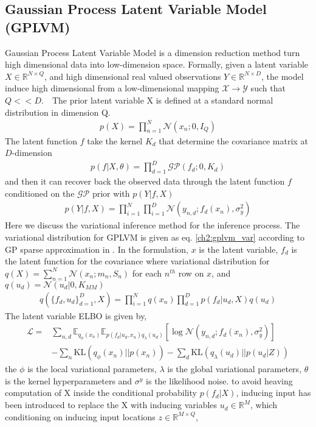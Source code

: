 \subsection{Gaussian Process Latent Variable Model (GPLVM)}
Gaussian Process Latent Variable Model \cite{lawrence_gaussian_nodate,titsias_bayesian_nodate} is a dimension reduction method turn high dimensional data into low-dimension space. Formally, given a latent variable $ X\in\mathbb{R}^{N\times Q} $, and high dimensional real valued observations $ Y\in\mathbb{R}^{N\times D} $, the model induce high dimensional from a low-dimensional mapping $ \mathcal{X}\rightarrow\mathcal{Y} $ such that $ Q<<D $.　The prior latent variable X is defined at a standard normal distribution in dimension Q.
\begin{align*}
p(X)=\prod_{n=1}^{N}\mathcal{N}(x_n;0,I_Q)
\end{align*}
The latent function $ f $ take the kernel $ K_d $ that determine the covariance matrix at $ D $-dimension
\begin{align*}
p(f|X,\theta)=\prod_{d=1}^{D}\mathcal{GP}(f_d;0,K_d)
\end{align*}
and then it can recover back the observed data through the latent function $ f $ conditioned on the $ \mathcal{GP} $ prior with $ p(Y|f,X) $
\begin{align*}
p(Y|f,X)=\prod_{i=1}^{N}\prod_{i=1}^{D}\mathcal{N}(y_{n,d};f_d(x_n),\sigma_y^2)
\end{align*}
Here we discuss the variational inference method for the inference process. The variational distribution for GPLVM is given as eq. \ref{ch2:gplvm_var} according to GP sparse approximation in \cite{lawrence_learning_2007}. In the formulation, $ x  $ is the latent variable, $ f_d $ is the latent function for the covariance 
where variational distribution for $ q(X)=\sum_{n=1}^{N}\mathcal{N}(x_n;m_n,S_n) $ for each $ n^{th} $ row on $ x $, and $ q(u_d)=\mathcal{N}(u_d|0,K_{MM}) $
\begin{align}\label{ch2:gplvm_var}
q(\{f_d,u_d\}^{D}_{d=1},X) = \prod_{i=1}^{N}q(x_n)\prod_{d=1}^{D}p(f_d|u_d,X)q(u_d)
\end{align}
The latent variable ELBO is given by,
\begin{align}
\mathcal{L}=&\sum_{n,d}\mathbb{E}_{q_\phi(x_n)}\mathbb{E}_{p(f_d|u_d,x_n)q_{\lambda}(u_d)}\left[\log\mathcal{N}(y_{n,d};f_d(x_n),\sigma_y^2)\right]\\
&-\sum_{n}\text{KL}(q_{\phi}(x_n)||p(x_n))-\sum_{d}\text{KL}(q_\lambda(u_d)||p(u_d|Z))
\end{align}
the $ \phi $ is the local variational parameters, $ \lambda $ is the global variational parameters, $ \theta $ is the kernel hyperparameters and $ \sigma^y $ is the likelihood noise.
to avoid heaving computation of X inside the conditional probability $ p(f_d|X) $, inducing input has been introduced \cite{lawrence_learning_2007} to replace the X with inducing variables $ u_d\in\mathbb{R}^M $, which conditioning on inducing input locations $ z\in\mathbb{R}^{M\times Q} $, 
